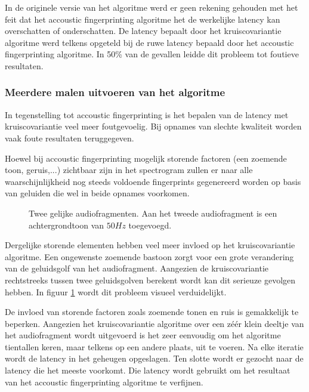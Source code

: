 In de originele versie van het algoritme werd er geen rekening gehouden met het feit dat het accoustic fingerprinting algoritme het de werkelijke latency kan overschatten of onderschatten. De latency bepaalt door het kruiscovariantie algoritme werd telkens opgeteld bij de ruwe latency bepaald door het accoustic fingerprinting algoritme. In 50\% van de gevallen leidde dit probleem tot foutieve resultaten.

\subsubsection{Meerdere malen uitvoeren van het algoritme}

In tegenstelling tot accoustic fingerprinting is het bepalen van de latency met kruiscovariantie veel meer foutgevoelig. Bij opnames van slechte kwaliteit worden vaak foute resultaten teruggegeven. 

Hoewel bij accoustic fingerprinting mogelijk storende factoren (een zoemende toon, geruis,...) zichtbaar zijn in het spectrogram zullen er naar alle waarschijnlijkheid nog steeds voldoende fingerprints gegenereerd worden op basis van geluiden die wel in beide opnames voorkomen. 

\begin{figure}[h!]
	\captionsetup{width=0.7\textwidth}
	\caption[Zoemtoon van $50 Hz$]{Twee gelijke audiofragmenten. Aan het tweede audiofragment is een achtergrondtoon van $50 Hz$ toegevoegd.}
	\begin{center}
		\advance\parskip0.3cm
		
	\end{center}
	\label{zoemtoon}
\end{figure}

Dergelijke storende elementen hebben veel meer invloed op het kruiscovariantie algoritme. Een ongewenste zoemende bastoon zorgt voor een grote verandering van de geluidsgolf van het audiofragment. Aangezien de kruiscovariantie rechtstreeks tussen twee geluidsgolven berekent wordt kan dit serieuze gevolgen hebben. In figuur \ref{zoemtoon} wordt dit probleem visueel verduidelijkt.

De invloed van storende factoren zoals zoemende tonen en ruis is gemakkelijk te beperken. Aangezien het kruiscovariantie algoritme over een zéér klein deeltje van het audiofragment wordt uitgevoerd is het zeer eenvoudig om het algoritme tientallen keren, maar telkens op een andere plaats, uit te voeren. Na elke iteratie wordt de latency in het geheugen opgeslagen. Ten slotte wordt er gezocht naar de latency die het meeste voorkomt. Die latency wordt gebruikt om het resultaat van het accoustic fingerprinting algoritme te verfijnen.

